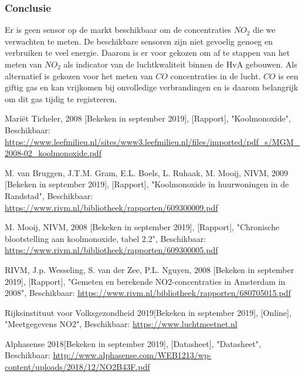 \documentclass[a4paper, 11pt]{article} %
\begin{document}
\subsubsection{Conclusie}
Er is geen sensor op de markt beschikbaar om de concentraties $NO_2$ die we verwachten te meten. De beschikbare sensoren zijn niet gevoelig genoeg en verbruiken te veel energie. Daarom is er voor gekozen om af te stappen van het meten van $NO_2$ als indicator van de luchtkwaliteit binnen de HvA gebouwen. Als alternatief is gekozen voor het meten van $CO$ concentraties in de lucht. $CO$ is een giftig gas en kan vrijkomen bij onvolledige verbrandingen en is daarom belangrijk om dit gas tijdig te registreren.
\newpage
\begin{thebibliography}{9}
	Mariët Ticheler, 
	2008 [Bekeken in september 2019],
	[Rapport],
	"Koolmonoxide",
	Beschikbaar: \url{https://www.leefmilieu.nl/sites/www3.leefmilieu.nl/files/imported/pdf_s/MGM_2008-02_koolmonoxide.pdf}
	
	M. van Bruggen, J.T.M. Gram, E.L. Boels, L. Ruhaak, M. Mooij,
	NIVM,
	2009 [Bekeken in september 2019],
	[Rapport],
	"Koolmonoxide in huurwoningen in de Randstad",
	Beschikbaar: \url{https://www.rivm.nl/bibliotheek/rapporten/609300009.pdf}
	
	M. Mooij,
	NIVM,
	2008 [Bekeken in september 2019],
	[Rapport],
	"Chronische blootstelling aan koolmonoxide, tabel 2.2",
	Beschikbaar: \url{https://www.rivm.nl/bibliotheek/rapporten/609300005.pdf}
	
	RIVM, J.p. Wesseling, S. van der Zee, P.L. Nguyen,
	2008 [Bekeken in september 2019],
	[Rapport],
	"Gemeten en berekende NO2-concentraties in Amsterdam in 2008",
	Beschikbaar: \url{https://www.rivm.nl/bibliotheek/rapporten/680705015.pdf}
	
	Rijksinstituut voor Volksgezondheid
	2019[Bekeken in september 2019],
	[Online],
	"Meetgegevens NO2",
	Beschikbaar: \url{https://www.luchtmeetnet.nl}
	
	Alphasense
	2018[Bekeken in september 2019],
	[Datasheet],
	"Datasheet",
	Beschikbaar: \url{http://www.alphasense.com/WEB1213/wp-content/uploads/2018/12/NO2B43F.pdf}
\end{thebibliography}
\end{document}
